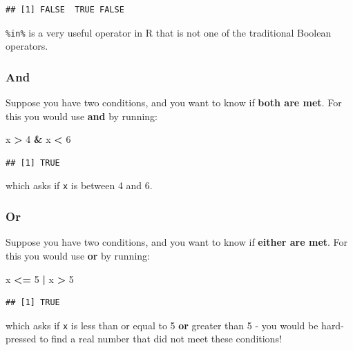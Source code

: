 \documentclass[]{book}
\newenvironment{Shaded}{\begin{snugshade}}{\end{snugshade}}
\newcommand{\DecValTok}[1]{\textcolor[rgb]{0.00,0.00,0.81}{#1}}
\newcommand{\StringTok}[1]{\textcolor[rgb]{0.31,0.60,0.02}{#1}}
\newcommand{\OperatorTok}[1]{\textcolor[rgb]{0.81,0.36,0.00}{\textbf{#1}}}
\newcommand{\NormalTok}[1]{#1}
\theoremstyle{definition}
\theoremstyle{definition}
\theoremstyle{definition}
\theoremstyle{remark}
\begin{document}
\begin{verbatim}
## [1] FALSE  TRUE FALSE
\end{verbatim}

\texttt{\%in\%} is a very useful operator in R that is not one of the
traditional Boolean operators.

\subsubsection*{And}\label{and}

Suppose you have two conditions, and you want to know if \textbf{both
are met}. For this you would use \textbf{and} by running:

\begin{Shaded}
\begin{Highlighting}[]
\NormalTok{x }\OperatorTok{>}\StringTok{ }\DecValTok{4} \OperatorTok{&}\StringTok{ }\NormalTok{x }\OperatorTok{<}\StringTok{ }\DecValTok{6}
\end{Highlighting}
\end{Shaded}

\begin{verbatim}
## [1] TRUE
\end{verbatim}

which asks if \texttt{x} is between 4 and 6.

\subsubsection*{Or}\label{or}

Suppose you have two conditions, and you want to know if \textbf{either
are met}. For this you would use \textbf{or} by running:

\begin{Shaded}
\begin{Highlighting}[]
\NormalTok{x }\OperatorTok{<=}\StringTok{ }\DecValTok{5} \OperatorTok{|}\StringTok{ }\NormalTok{x }\OperatorTok{>}\StringTok{ }\DecValTok{5}
\end{Highlighting}
\end{Shaded}

\begin{verbatim}
## [1] TRUE
\end{verbatim}

which asks if \texttt{x} is less than or equal to 5 \textbf{or} greater
than 5 - you would be hard-pressed to find a real number that did not
meet these conditions!
\end{document}
